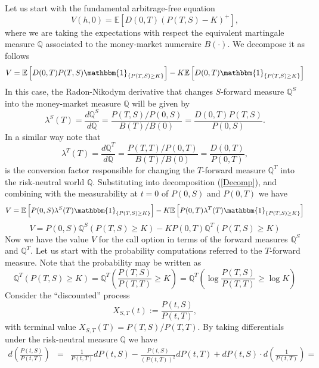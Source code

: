 \begin{demo}
Let us start with the fundamental arbitrage-free equation
$$
V(h,0)=\mathbb{E}\left[ D(0,T) (P(T,S)-K)^+\right],
$$
where we are taking the expectations with respect the equivalent
martingale measure $\mathbb{Q}$ associated to the money-market
numeraire $B(\cdot)$.
We decompose it as follows
\begin{equation}
\label{Decomp}
V=\mathbb{E}\left[ D(0,T) P(T,S)\mathbbm{1}_{\{P(T,S)\geq
    K\}}\right]-K \mathbb{E}\left[ D(0,T)\mathbbm{1}_{\{P(T,S)\geq
    K\}}\right] 
\end{equation}
In this case, the Radon-Nikodym derivative that changes $S$-forward
measure $\mathbb{Q}^S$ into the money-market measure $\mathbb{Q}$ will be
given by
$$
\lambda^S(T)=\frac{d\mathbb{Q}^S}{d\mathbb{Q}}=\frac{P(T,S)/P(0,S)}{B(T)/B(0)}=\frac{D(0,T)P(T,S)}{P(0,S)}.  
$$
In a similar way note that
$$
\lambda^T(T)=\frac{d\mathbb{Q}^T}{d\mathbb{Q}}=\frac{P(T,T)/P(0,T)}{B(T)/B(0)}=\frac{D(0,T)}{P(0,T)},
$$
is the conversion factor responsible for changing the $T$-forward
measure $\mathbb{Q}^T$ into the risk-neutral world
$\mathbb{Q}$. Substituting into decomposition (\ref{Decomp}), and 
combining with the measurability at $t=0$ of $P(0,S)$ and $P(0,T)$ we
have
\begin{equation} 
\nonumber
V = \mathbb{E}\left[ P(0,S) \lambda^S(T) \mathbbm{1}_{\{P(T,S)\geq
    K\}}\right]-K \mathbb{E}\left[ P(0,T) \lambda^T(T)
  \mathbbm{1}_{\{P(T,S)\geq K\}}\right] 
\end{equation}
\begin{equation} 
\nonumber
V = P(0,S) \mathbb{Q}^S\left( P(T,S)\geq K\right)-K P(0,T)
\mathbb{Q}^T\left( P(T,S)\geq K \right)
\end{equation}
Now we have the value $V$ for the call option in terms of the forward
measures $\mathbb{Q}^S$ and $\mathbb{Q}^T$. Let us start with the
probability computations referred to the $T$-forward measure. Note
that the probability may be written as
$$
\mathbb{Q}^T(P(T,S)\geq K)=\mathbb{Q}^T\left(\frac{P(T,S)}{P(T,T)}\geq K\right)
=\mathbb{Q}^T\left(\log\frac{P(T,S)}{P(T,T)}\geq \log K\right)$$
Consider the ``discounted'' process
$$
X_{S,T}(t):=\frac{P(t,S)}{P(t,T)},
$$
with terminal value $X_{S,T}(T)=P(T,S)/P(T,T)$. By taking differentials
under the risk-neutral measure $\mathbb{Q}$ we have
\begin{equation}
\nonumber
\begin{array}{rcl}
\displaystyle d\left( \frac{P(t,S)}{P(t,T)}\right) &=&\displaystyle \frac{1}{P(t,T)}dP(t,S)-\frac{P(t,S)}{(P(t,T))^2}dP(t,T)+dP(t,S)\cdot d\left(\frac{1}{P(t,T)}\right)=\\ 

\end{array}
\end{equation}
\end{demo}
